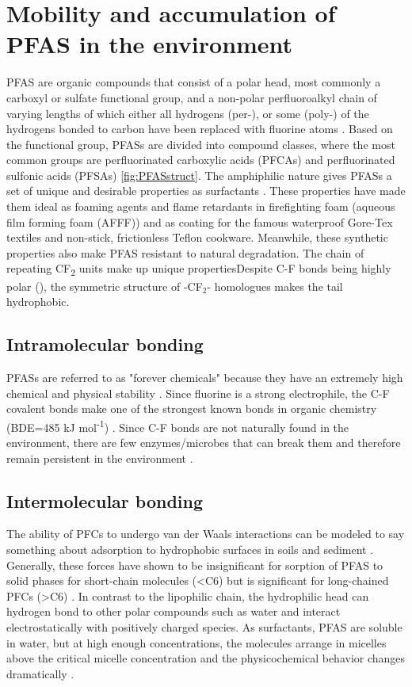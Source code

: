 \section{Mobility and accumulation of PFAS in the environment}
PFAS are organic compounds that consist of a polar head, most commonly a carboxyl or sulfate functional group, and a non-polar perfluoroalkyl chain of varying lengths of which either all hydrogens (per-), or some (poly-) of the hydrogens bonded to carbon have been replaced with fluorine atoms \citep{wang2011physchem}. Based on the functional group, PFASs are divided into compound classes, where the most common groups are perfluorinated carboxylic acids (PFCAs) and perfluorinated sulfonic acids (PFSAs) \cref{fig:PFASstruct}. The amphiphilic nature gives PFASs a set of unique and desirable properties as surfactants \citep{du2014adsorption}. These properties have made them ideal as foaming agents and flame retardants in firefighting foam (aqueous film forming foam (AFFF)) and as coating for the famous waterproof Gore-Tex\textsuperscript{\textregistered} textiles and non-stick, frictionless Teflon\textsuperscript{\texttrademark} cookware. Meanwhile, these synthetic properties also make PFAS resistant to natural degradation. The chain of repeating CF\textsubscript{2} units make up unique propertiesDespite C-F bonds being highly polar (\textDelta {}), the symmetric structure of -CF$_2$- homologues makes the tail hydrophobic. 

\subsection{Intramolecular bonding}
PFASs are referred to as "forever chemicals" because they have an extremely high chemical and physical stability \citep{beans2021}. Since fluorine is a strong electrophile, the C-F covalent bonds make one of the strongest known bonds in organic chemistry (BDE=485 kJ mol\textsuperscript{-1}) \citep{Lau2007}. Since C-F bonds are not naturally found in the environment, there are few enzymes/microbes that can break them and therefore remain persistent in the environment \citep{shahsavari2021}. 

\subsection{Intermolecular bonding}
The ability of PFCs to undergo van der Waals interactions can be modeled to say something about adsorption to hydrophobic surfaces in soils and sediment \citep{Arp2006}. Generally, these forces have shown to be insignificant for sorption of PFAS to solid phases for short-chain molecules (\textless C6) but is significant for long-chained PFCs (\textgreater C6) \citep{du2014adsorption}. In contrast to the lipophilic chain, the hydrophilic head can hydrogen bond to other polar compounds such as water and interact electrostatically with positively charged species. As surfactants, PFAS are soluble in water, but at high enough concentrations, the molecules arrange in micelles above the critical micelle concentration and the physicochemical behavior changes dramatically \citep{bhhatarai2011,Goss2009comment}.  

